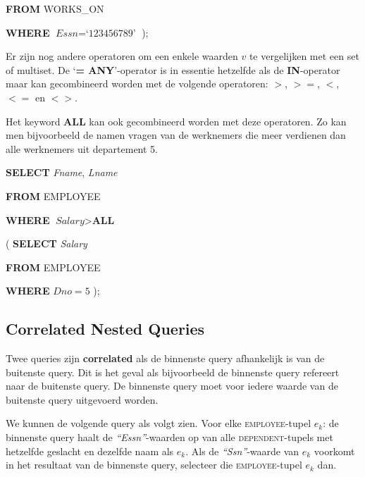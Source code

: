 \hspace{40mm}
\phantom{(} \textbf{FROM} WORKS\_ON

\hspace{40mm}
\phantom{(} \textbf{WHERE} $\textit{Essn} = \textit{`123456789'}$ );
\vspace{3mm}

\noindent Er zijn nog andere operatoren om een enkele waarden $v$ te vergelijken met een set of multiset. De `\textbf{= ANY}'-operator is in essentie hetzelfde als de \textbf{IN}-operator maar kan gecombineerd worden met de volgende operatoren: $>$, $>=$, $<$, $<=$ en $<>$.

Het keyword \textbf{ALL} kan ook gecombineerd worden met deze operatoren. Zo kan men bijvoorbeeld de namen vragen van de werknemers die meer verdienen dan alle werknemers uit departement 5.

\vspace{1mm}\hspace{10mm}
\textbf{SELECT} \textit{Fname}, \textit{Lname}

\hspace{10mm}
\textbf{FROM} EMPLOYEE

\hspace{10mm}
\textbf{WHERE} $\textit{Salary} > \textbf{ALL}$

\hspace{40mm}
( \textbf{SELECT} \textit{Salary}

\hspace{40mm}
\phantom{(} \textbf{FROM} EMPLOYEE

\hspace{40mm}
\phantom{(} \textbf{WHERE} $\textit{Dno} = 5$ );


\subsection{Correlated Nested Queries}
Twee queries zijn \textbf{correlated} als de binnenste query afhankelijk is van de buitenste query. Dit is het geval als bijvoorbeeld de binnenste query refereert naar de buitenste query. De binnenste query moet voor iedere waarde van de buitenste query uitgevoerd worden.

We kunnen de volgende query als volgt zien. Voor elke \textsc{employee}-tupel $e_k$: de binnenste query haalt de \textit{``Essn''}-waarden op van alle \textsc{dependent}-tupels met hetzelfde geslacht en dezelfde naam als $e_k$. Als de \textit{``Ssn''}-waarde van $e_k$ voorkomt in het resultaat van de binnenste query, selecteer die \textsc{employee}-tupel $e_k$ dan.

